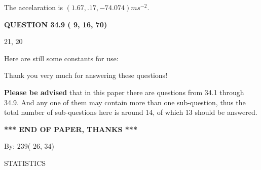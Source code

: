 \documentclass[12pt]{article}
\begin{document}
  
 
 
\noindent{}
 
 
  The accelaration is $  %
(
1.67,
.17,
-74.074)
ms^{-2} $.
 
 
 
 
  
\vspace{0.2in}
  
{\textbf{\Large{QUESTION
34.9 
 (          9,         16,         70)
}}}
  
  


 
 
\noindent{}

21,  %
20
 
 
 
   
   
 \vspace{0.2in}
Here are still some constants for use:
 
 
 
 
Thank you very much for answering these questions!
 
{\textbf{\large{Please be advised}}} that in this paper there are questions from
34.1 through
34.9.
And any one of them may contain more than one sub-question, thus the total number
of sub-questions here is around 14, of which
13 should be answered.
 
   
   
   
   
\vspace{1.0in} 
{\textbf{\large{ *** END OF PAPER, THANKS *** }}} 
   
   
\hspace{1.0in} By: 
         239(         26,          34)
   
   
   
\vspace{0.2in}
\vspace{0.2in}
   
   
 \newpage
\setcounter{page}{1} 
   
   
 {\LARGE{STATISTICS}}
   
\vspace{0.2in}
   
\end{document}
